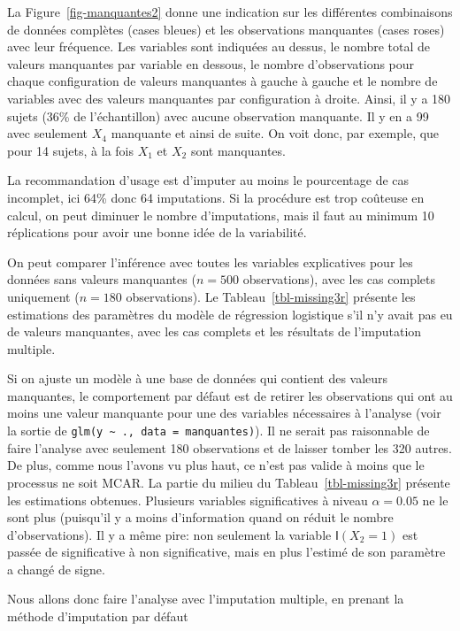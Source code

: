 \documentclass[
  11pt,
  letterpaper,
]{scrbook}
\theoremstyle{definition}
\theoremstyle{remark}
\begin{document}
La Figure~\ref{fig-manquantes2} donne une indication sur les différentes
combinaisons de données complètes (cases bleues) et les observations
manquantes (cases roses) avec leur fréquence. Les variables sont
indiquées au dessus, le nombre total de valeurs manquantes par variable
en dessous, le nombre d'observations pour chaque configuration de
valeurs manquantes à gauche à gauche et le nombre de variables avec des
valeurs manquantes par configuration à droite. Ainsi, il y a 180 sujets
(36\% de l'échantillon) avec aucune observation manquante. Il y en a 99
avec seulement \(X_4\) manquante et ainsi de suite. On voit donc, par
exemple, que pour 14 sujets, à la fois \(X_1\) et \(X_2\) sont
manquantes.

La recommandation d'usage est d'imputer au moins le pourcentage de cas
incomplet, ici 64\% donc 64 imputations. Si la procédure est trop
coûteuse en calcul, on peut diminuer le nombre d'imputations, mais il
faut au minimum 10 réplications pour avoir une bonne idée de la
variabilité.

On peut comparer l'inférence avec toutes les variables explicatives pour
les données sans valeurs manquantes (\(n=500\) observations), avec les
cas complets uniquement (\(n=180\) observations). Le
Tableau~\ref{tbl-missing3r} présente les estimations des paramètres du
modèle de régression logistique s'il n'y avait pas eu de valeurs
manquantes, avec les cas complets et les résultats de l'imputation
multiple.

Si on ajuste un modèle à une base de données qui contient des valeurs
manquantes, le comportement par défaut est de retirer les observations
qui ont au moins une valeur manquante pour une des variables nécessaires
à l'analyse (voir la sortie de
\texttt{glm(y\ \textasciitilde{}\ .,\ data\ =\ manquantes)}). Il ne
serait pas raisonnable de faire l'analyse avec seulement 180
observations et de laisser tomber les 320 autres. De plus, comme nous
l'avons vu plus haut, ce n'est pas valide à moins que le processus ne
soit MCAR. La partie du milieu du Tableau~\ref{tbl-missing3r} présente
les estimations obtenues. Plusieurs variables significatives à niveau
\(\alpha=0.05\) ne le sont plus (puisqu'il y a moins d'information quand
on réduit le nombre d'observations). Il y a même pire: non seulement la
variable \(\mathsf{I}(X_2=1)\) est passée de significative à non
significative, mais en plus l'estimé de son paramètre a changé de signe.

Nous allons donc faire l'analyse avec l'imputation multiple, en prenant
la méthode d'imputation par défaut
\end{document}
